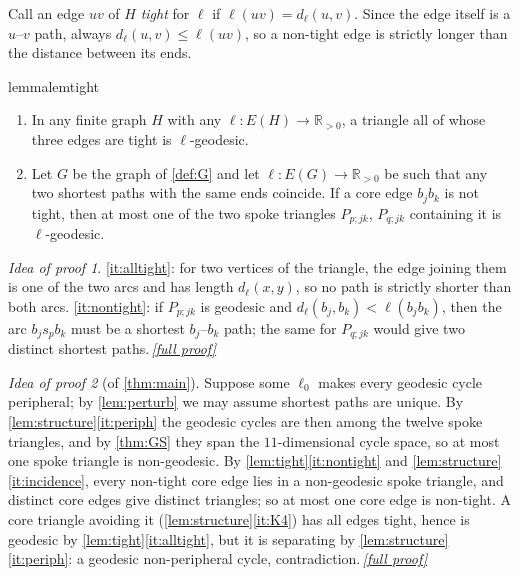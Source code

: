 \documentclass[11pt,a4paper]{article}
\theoremstyle{plain}
\theoremstyle{definition}
\theoremstyle{remark}
\newtheorem*{proofidea}{Idea of proof}
\newcommand{\fullproofref}[1]{\,\hyperref[#1]{\textit{[full proof]}}}
\newcommand{\R}{\mathbb R}
\newcommand{\dl}{d_\ell}
\begin{document}
Call an edge $uv$ of $H$ \emph{tight} for $\ell$ if $\ell(uv)=\dl(u,v)$. Since the edge itself is a $u$--$v$ path, always $\dl(u,v)\le\ell(uv)$, so a non-tight edge is strictly longer than the distance between its ends.

\begin{restatable}{lemma}{lemtight}\label{lem:tight}
\begin{enumerate}[label=\textup{(\roman*)},nosep]
\item\label{it:alltight} In any finite graph $H$ with any $\ell\colon E(H)\to\R_{>0}$, a triangle all of whose three edges are tight is $\ell$-geodesic.
\item\label{it:nontight} Let $G$ be the graph of \cref{def:G} and let $\ell\colon E(G)\to\R_{>0}$ be such that any two shortest paths with the same ends coincide. If a core edge $b_jb_k$ is not tight, then at most one of the two spoke triangles $P_{p;jk}$, $P_{q;jk}$ containing it is $\ell$-geodesic.
\end{enumerate}
\end{restatable}
\begin{proofidea}
\ref{it:alltight}: for two vertices of the triangle, the edge joining them is one of the two arcs and has length $\dl(x,y)$, so no path is strictly shorter than both arcs. \ref{it:nontight}: if $P_{p;jk}$ is geodesic and $\dl(b_j,b_k)<\ell(b_jb_k)$, then the arc $b_js_pb_k$ must be a shortest $b_j$--$b_k$ path; the same for $P_{q;jk}$ would give two distinct shortest paths.\fullproofref{pf:tight}
\end{proofidea}

\begin{proofidea}[of \cref{thm:main}]
Suppose some $\ell_0$ makes every geodesic cycle peripheral; by \cref{lem:perturb} we may assume shortest paths are unique. By \cref{lem:structure}\ref{it:periph} the geodesic cycles are then among the twelve spoke triangles, and by \cref{thm:GS} they span the $11$-dimensional cycle space, so at most one spoke triangle is non-geodesic. By \cref{lem:tight}\ref{it:nontight} and \cref{lem:structure}\ref{it:incidence}, every non-tight core edge lies in a non-geodesic spoke triangle, and distinct core edges give distinct triangles; so at most one core edge is non-tight. A core triangle avoiding it (\cref{lem:structure}\ref{it:K4}) has all edges tight, hence is geodesic by \cref{lem:tight}\ref{it:alltight}, but it is separating by \cref{lem:structure}\ref{it:periph}: a geodesic non-peripheral cycle, contradiction.\fullproofref{pf:main}
\end{proofidea}
\end{document}
